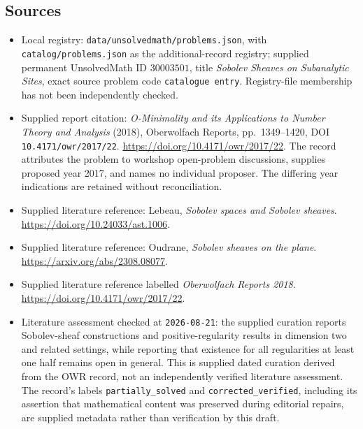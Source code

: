 \documentclass[11pt]{article}
\begin{document}
\subsection{Sources}
\begin{itemize}
\item Local registry: \texttt{data/unsolvedmath/problems.json}, with \texttt{catalog/problems.json} as the additional-record registry; supplied permanent UnsolvedMath ID \(30003501\), title \emph{Sobolev Sheaves on Subanalytic Sites}, exact source problem code \texttt{catalogue entry}. Registry-file membership has not been independently checked.
\item Supplied report citation: \emph{O-Minimality and its Applications to Number Theory and Analysis} (2018), Oberwolfach Reports, pp.~1349--1420, DOI \texttt{10.4171/owr/2017/22}. \url{https://doi.org/10.4171/owr/2017/22}. The record attributes the problem to workshop open-problem discussions, supplies proposed year 2017, and names no individual proposer. The differing year indications are retained without reconciliation.
\item Supplied literature reference: Lebeau, \emph{Sobolev spaces and Sobolev sheaves}. \url{https://doi.org/10.24033/ast.1006}.
\item Supplied literature reference: Oudrane, \emph{Sobolev sheaves on the plane}. \url{https://arxiv.org/abs/2308.08077}.
\item Supplied literature reference labelled \emph{Oberwolfach Reports 2018}. \url{https://doi.org/10.4171/owr/2017/22}.
\item Literature assessment checked at \texttt{2026-08-21}: the supplied curation reports Sobolev-sheaf constructions and positive-regularity results in dimension two and related settings, while reporting that existence for all regularities at least one half remains open in general. This is supplied dated curation derived from the OWR record, not an independently verified literature assessment. The record's labels \texttt{partially\_solved} and \texttt{corrected\_verified}, including its assertion that mathematical content was preserved during editorial repairs, are supplied metadata rather than verification by this draft.
\end{itemize}
\end{document}
